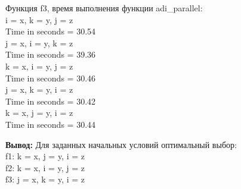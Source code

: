 \documentclass[a4paper,12pt,titlepage,draft]{article}
\begin{document}
\vspace{0.5cm}
\noindent
\begin{minipage}{.5\textwidth}
    Функция f3, время выполнения функции adi\_parallel:\\

    i = x, k = y, j = z\\
    Time in seconds =             30.54\\
    j = x, i = y, k = z\\
    Time in seconds =             39.36\\
    k = x, i = y, j = z\\
    Time in seconds =             30.46\\
    j = x, k = y, i = z\\
    Time in seconds =             30.42\\
    k = x, j = y, i = z\\
    Time in seconds =             30.44\\
\end{minipage}

\noindent \textbf{Вывод:} Для заданных начальных условий оптимальный выбор:\\
f1: k = x, j = y, i = z\\
f2: k = x, i = y, j = z\\
f3: j = x, k = y, i = z
\newpage
\end{document}

